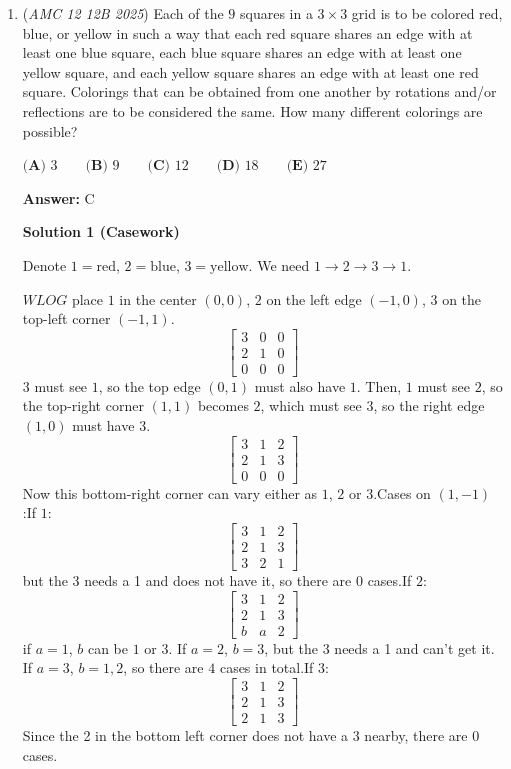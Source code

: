 \begin{enumerate}
	\item (\textit{AMC 12 12B 2025}) Each of the $9$ squares in a ${3 \times 3}$ grid is to be colored red, blue, or yellow in such a way that each red square shares an edge with at least one blue square, each blue square shares an edge with at least one yellow square, and each yellow square shares an edge with at least one red square. Colorings that can be obtained from one another by rotations and/or reflections are to be considered the same. How many different colorings are possible?


 $\textbf{(A) } 3 \qquad \textbf{(B) } 9 \qquad \textbf{(C) } 12 \qquad \textbf{(D) } 18 \qquad \textbf{(E) } 27$

 \textbf{Answer: }C



\textbf{Solution 1 (Casework)}

Denote $1=\text{red}$, $2=\text{blue}$, $3=\text{yellow}$. We need $1\to 2\to 3\to 1$.

 $WLOG$ place $1$ in the center $(0,0)$, $2$ on the left edge $(-1,0)$, $3$ on the top-left corner $(-1,1)$.
 \[\begin{bmatrix} 3 & 0 & 0 \\ 2 & 1 & 0 \\ 0 & 0 & 0 \end{bmatrix}\]$3$ must see $1$, so the top edge $(0,1)$ must also have $1$. Then, $1$ must see $2$, so the top-right corner $(1,1)$ becomes $2$, which must see $3$, so the right edge $(1,0)$ must have $3$.
 \[\begin{bmatrix} 3 & 1 & 2 \\ 2 & 1 & 3 \\ 0 & 0 & 0 \end{bmatrix}\]Now this bottom-right corner can vary either as $1$, $2$ or $3$.Cases on $(1,-1)$:If $1$:
 \[\begin{bmatrix} 3 & 1 & 2 \\ 2 & 1 & 3 \\ 3 & 2 & 1 \end{bmatrix}\]but the 3 needs a 1 and does not have it, so there are $0$ cases.If $2$:
 \[\begin{bmatrix} 3 & 1 & 2 \\ 2 & 1 & 3 \\ b & a & 2 \end{bmatrix}\]if $a=1$, $b$ can be $1$ or $3$. If $a=2$, $b=3$, but the 3 needs a 1 and can't get it. If $a=3$, $b=1,2$, so there are $4$ cases in total.If $3$:
 \[\begin{bmatrix} 3 & 1 & 2 \\ 2 & 1 & 3 \\ 2 & 1 & 3 \end{bmatrix}\]Since the 2 in the bottom left corner does not have a 3 nearby, there are $0$ cases.


\end{enumerate}

